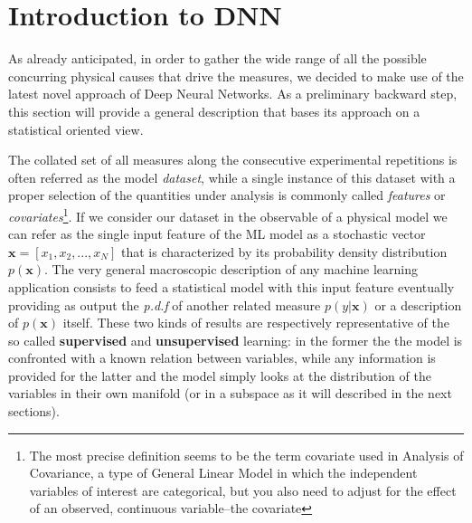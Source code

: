 \section{Introduction to DNN}

As already anticipated, in order to gather the wide range of all the possible concurring physical causes that drive the measures, we decided to make use of the latest novel approach of Deep Neural Networks. As a preliminary backward step, this section will provide a general description that bases its approach on a statistical oriented view.

The collated set of all measures along the consecutive experimental repetitions is often referred as the model \textit{dataset}, while a single instance of this dataset with a proper selection of the quantities under analysis is commonly called \textit{features} or \textit{covariates}\footnote{The most precise definition seems to be the term covariate used in Analysis of Covariance, a type of General Linear Model in which the independent variables of interest are categorical, but you also need to adjust for the effect of an observed, continuous variable–the covariate}.
%
If we consider our dataset in the observable of a physical model we can refer as the single input feature of the ML model as a stochastic vector $\bm{x} = [x_1,x_2, ... ,x_N]$ that is characterized by its probability density distribution $p(\bm{x})$. The very general macroscopic description of any machine learning application consists to feed a statistical model with this input feature eventually providing as output the \textit{p.d.f} of another related measure $p(y|\bm{x})$ or a description of $p(\bm{x})$ itself. These two kinds of results are respectively representative of the so called  \textbf{supervised} and \textbf{unsupervised} learning: in the former the the model is confronted with a known relation between variables, while any information is provided for the latter and the model simply looks at the distribution of the variables in their own manifold (or in a subspace as it will described in the next sections).

